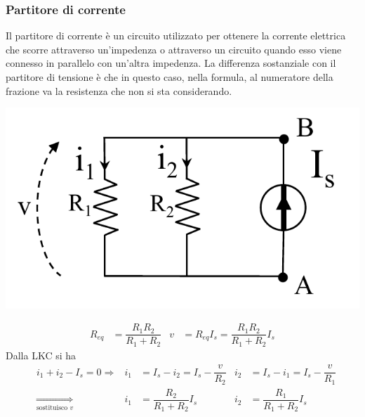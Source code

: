\documentclass{article}
\begin{document}
\subsubsection{Partitore di corrente}
Il partitore di corrente è un circuito utilizzato per ottenere la corrente elettrica che scorre attraverso un'impedenza o attraverso un circuito quando esso viene connesso in parallelo con un'altra impedenza. La differenza sostanziale con il partitore di tensione è che in questo caso, nella formula, al numeratore della frazione va la resistenza che non si sta considerando.
\begin{center}
    \includegraphics[scale=0.35]{Image/Partitore di corrente.png}
\end{center}
\begin{align*}
    R_{eq} &= \dfrac{R_1R_2}{R_1+R_2} & v &= R_{eq}I_s = \dfrac{R_1R_2}{R_1+R_2}I_s
\end{align*}
Dalla LKC si ha
\begin{align*}
    &i_1 + i_2 -I_s = 0 \Longrightarrow & i_1 &= I_s - i_2 = I_s - \dfrac{v}{R_2} &  i_2 &= I_s - i_1 = I_s - \dfrac{v}{R_1}\\
    &\underset{\text{sostituisco } v}{\Longrightarrow} & i_1 &= \dfrac{R_2}{R_1+R_2}I_s &  i_2 &= \dfrac{R_1}{R_1+R_2}I_s
\end{align*}
\end{document}
